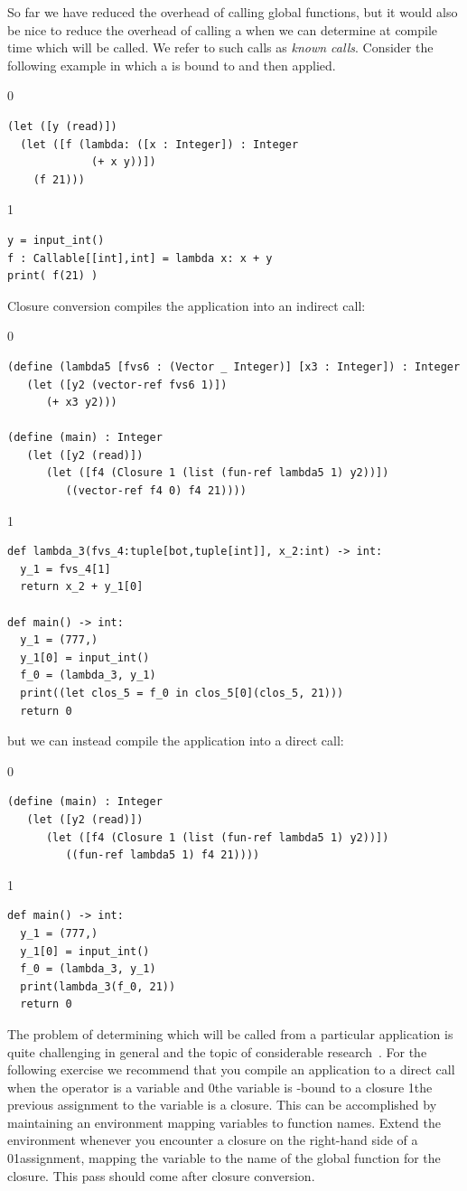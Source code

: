 \documentclass[7x10,nocrop]{TimesAPriori_MIT}%
\def\racketEd{0}
\def\pythonEd{1}
\def\edition{0}
\newcommand{\racket}[1]{{\if\edition\racketEd{#1}\fi}}
\newcommand{\python}[1]{{\if\edition\pythonEd #1\fi}}
\begin{document}
So far we have reduced the overhead of calling global functions, but
it would also be nice to reduce the overhead of calling a
 when we can determine at compile time which
 will be called. We refer to such calls as \emph{known
  calls}.  Consider the following example in which a  is
bound to  and then applied.
{\if\edition\racketEd
\begin{lstlisting}
(let ([y (read)])
  (let ([f (lambda: ([x : Integer]) : Integer
             (+ x y))])
    (f 21)))
\end{lstlisting}
\fi}
{\if\edition\pythonEd
\begin{lstlisting}
y = input_int()
f : Callable[[int],int] = lambda x: x + y
print( f(21) )
\end{lstlisting}
\fi}
%
\noindent Closure conversion compiles the application
 into an indirect call:
%
{\if\edition\racketEd
\begin{lstlisting}
(define (lambda5 [fvs6 : (Vector _ Integer)] [x3 : Integer]) : Integer
   (let ([y2 (vector-ref fvs6 1)])
      (+ x3 y2)))

(define (main) : Integer
   (let ([y2 (read)])
      (let ([f4 (Closure 1 (list (fun-ref lambda5 1) y2))])
         ((vector-ref f4 0) f4 21))))
\end{lstlisting}
\fi}
{\if\edition\pythonEd
\begin{lstlisting}
def lambda_3(fvs_4:tuple[bot,tuple[int]], x_2:int) -> int:
  y_1 = fvs_4[1]
  return x_2 + y_1[0]

def main() -> int:
  y_1 = (777,)
  y_1[0] = input_int()
  f_0 = (lambda_3, y_1)
  print((let clos_5 = f_0 in clos_5[0](clos_5, 21)))
  return 0
\end{lstlisting}
\fi}
%
\noindent but we can instead compile the application
 into a direct call:
%
{\if\edition\racketEd
\begin{lstlisting}
(define (main) : Integer
   (let ([y2 (read)])
      (let ([f4 (Closure 1 (list (fun-ref lambda5 1) y2))])
         ((fun-ref lambda5 1) f4 21))))
\end{lstlisting}
\fi}
{\if\edition\pythonEd
\begin{lstlisting}
def main() -> int:
  y_1 = (777,)
  y_1[0] = input_int()
  f_0 = (lambda_3, y_1)
  print(lambda_3(f_0, 21))
  return 0
\end{lstlisting}
\fi}

The problem of determining which  will be called from a
particular application is quite challenging in general and the topic
of considerable research~\citep{Shivers:1988aa,Gilray:2016aa}. For the
following exercise we recommend that you compile an application to a
direct call when the operator is a variable and \racket{the variable
  is -bound to a closure} \python{the previous assignment to
  the variable is a closure}.  This can be accomplished by maintaining
an environment mapping variables to function names.  Extend the
environment whenever you encounter a closure on the right-hand side of
a \racket{}\python{assignment}, mapping the variable to the
name of the global function for the closure. This pass should come
after closure conversion.
\end{document}
